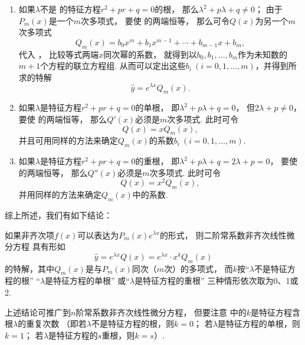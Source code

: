 \begin{enumerate}
\item 如果\(\lambda\)不是  的特征方程\(r^2+pr+q=0\)的根，%
那么\(\lambda^2+p\lambda+q\neq0\)；
由于\(P_m(x)\)是一个\(m\)次多项式，%
要使  的两端恒等，%
那么可令\(Q(x)\)为另一个\(m\)次多项式\[
Q_m(x) = b_0 x^m + b_1 x^{m-1} + \dotsb + b_{m-1} x + b_m,
\]
代入 ，%
比较等式两端\(x\)同次幂的系数，%
就得到以\(b_0,b_1,\dotsc,b_m\)作为未知数的\(m+1\)个方程的联立方程组.
从而可以定出这些\(b_i\ (i=0,1,\dotsc,m)\)，并得到所求的特解\[
\hat{y} = e^{\lambda x} Q_m(x).
\]

\item 如果\(\lambda\)是特征方程\(r^2+pr+q=0\)的单根，%
即\(\lambda^2+p\lambda+q=0\)，%
但\(2\lambda+p\neq0\)，%
要使  的两端恒等，%
那么\(Q'(x)\)必须是\(m\)次多项式.
此时可令\[
Q(x) = x Q_m(x),
\]并且可用同样的方法来确定\(Q_m(x)\)的系数\(b_i\ (i=0,1,\dotsc,m)\).

\item 如果\(\lambda\)是特征方程\(r^2+pr+q=0\)的重根，%
即\(\lambda^2+p\lambda+q=2\lambda+p=0\)，%
要使  的两端恒等，%
那么\(Q''(x)\)必须是\(m\)次多项式.
此时可令\[
Q(x) = x^2 Q_m(x),
\]并用同样的方法来确定\(Q_m(x)\)中的系数.
\end{enumerate}

综上所述，我们有如下结论：

如果非齐次项\(f(x)\)可以表达为\(P_m(x) e^{\lambda x}\)的形式，%
则二阶常系数非齐次线性微分方程  具有形如
\begin{equation}\label{equation:微分方程.二阶常系数齐次线性微分方程.特解1}
\hat{y} = e^{\lambda x} Q(x)
= e^{\lambda x} \cdot x^k Q_m(x)
\end{equation}
的特解，其中\(Q_m(x)\)是与\(P_m(x)\)同次（\(m\)次）的多项式，%
而\(k\)按“\(\lambda\)不是特征方程的根”%
“\(\lambda\)是特征方程的单根”%
或“\(\lambda\)是特征方程的重根”%
三种情形依次取为0、1或2.

上述结论可推广到\(n\)阶常系数非齐次线性微分方程，%
但要注意  中的\(k\)是特征方程含根\(\lambda\)的重复次数%
（即若\(\lambda\)不是特征方程的根，则\(k=0\)；
若\(\lambda\)是特征方程的单根，则\(k=1\)；
若\(\lambda\)是特征方程的\(s\)重根，则\(k=s\)）.

